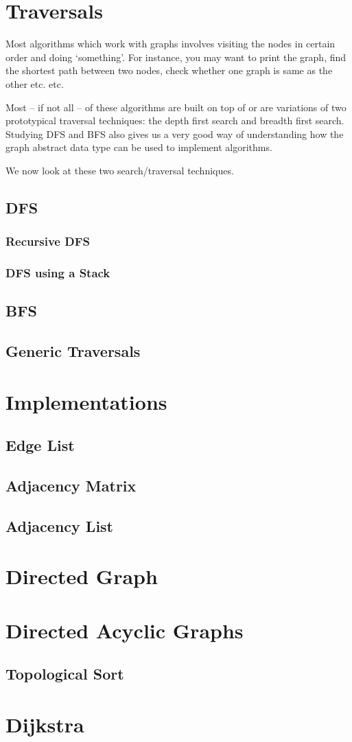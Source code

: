 \documentclass[12pt,a4paper]{article}
\begin{document}
\section{Traversals}
Most algorithms which work with graphs involves visiting the nodes in certain order and doing `something'. For instance, you may want to print the graph, find the shortest path between two nodes, check whether one graph is same as the other etc. etc.

Most -- if not all -- of these algorithms are built on top of or are variations of two prototypical traversal techniques: the depth first search and breadth first search. Studying DFS and BFS also gives us a very good way of understanding how the graph abstract data type can be used to implement algorithms.

We now look at these two search/traversal techniques.

\subsection{DFS}
\subsubsection{Recursive DFS}
\subsubsection{DFS using a Stack}
\subsection{BFS}

\subsection{Generic Traversals}

\section{Implementations}
\subsection{Edge List}
\subsection{Adjacency Matrix}
\subsection{Adjacency List}

\section{Directed Graph}

\section{Directed Acyclic Graphs}
\subsection{Topological Sort}

\section{Dijkstra}
\end{document}
